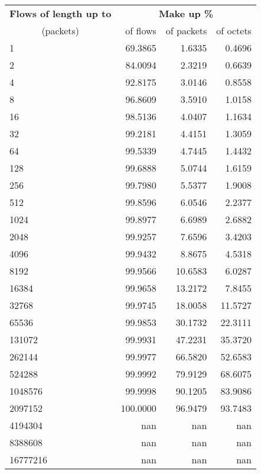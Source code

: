 \begin{tabular}{@{}lrrr@{}}
\toprule
\textbf{Flows of length up to} & \multicolumn{3}{c}{\textbf{Make up \%}} \\
\cmidrule(lr){2-4}
\multicolumn{1}{c}{(packets)} & of flows & of packets & of octets \\
\midrule
1 & 69.3865 & 1.6335 & 0.4696 \\
2 & 84.0094 & 2.3219 & 0.6639 \\
4 & 92.8175 & 3.0146 & 0.8558 \\
8 & 96.8609 & 3.5910 & 1.0158 \\
16 & 98.5136 & 4.0407 & 1.1634 \\
32 & 99.2181 & 4.4151 & 1.3059 \\
64 & 99.5339 & 4.7445 & 1.4432 \\
128 & 99.6888 & 5.0744 & 1.6159 \\
256 & 99.7980 & 5.5377 & 1.9008 \\
512 & 99.8596 & 6.0546 & 2.2377 \\
1024 & 99.8977 & 6.6989 & 2.6882 \\
2048 & 99.9257 & 7.6596 & 3.4203 \\
4096 & 99.9432 & 8.8675 & 4.5318 \\
8192 & 99.9566 & 10.6583 & 6.0287 \\
16384 & 99.9658 & 13.2172 & 7.8455 \\
32768 & 99.9745 & 18.0058 & 11.5727 \\
65536 & 99.9853 & 30.1732 & 22.3111 \\
131072 & 99.9931 & 47.2231 & 35.3720 \\
262144 & 99.9977 & 66.5820 & 52.6583 \\
524288 & 99.9992 & 79.9129 & 68.6075 \\
1048576 & 99.9998 & 90.1205 & 83.9086 \\
2097152 & 100.0000 & 96.9479 & 93.7483 \\
4194304 & nan & nan & nan \\
8388608 & nan & nan & nan \\
16777216 & nan & nan & nan \\
\bottomrule
\end{tabular}


